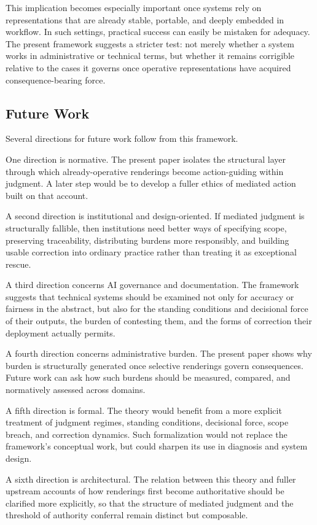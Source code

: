 \documentclass[11pt]{article}
\begin{document}
This implication becomes especially important once systems rely on representations that are already stable, portable, and deeply embedded in workflow. In such settings, practical success can easily be mistaken for adequacy. The present framework suggests a stricter test: not merely whether a system works in administrative or technical terms, but whether it remains corrigible relative to the cases it governs once operative representations have acquired consequence-bearing force.

\subsection{Future Work}

Several directions for future work follow from this framework.

One direction is normative. The present paper isolates the structural layer through which already-operative renderings become action-guiding within judgment. A later step would be to develop a fuller ethics of mediated action built on that account.

A second direction is institutional and design-oriented. If mediated judgment is structurally fallible, then institutions need better ways of specifying scope, preserving traceability, distributing burdens more responsibly, and building usable correction into ordinary practice rather than treating it as exceptional rescue.

A third direction concerns AI governance and documentation. The framework suggests that technical systems should be examined not only for accuracy or fairness in the abstract, but also for the standing conditions and decisional force of their outputs, the burden of contesting them, and the forms of correction their deployment actually permits.

A fourth direction concerns administrative burden. The present paper shows why burden is structurally generated once selective renderings govern consequences. Future work can ask how such burdens should be measured, compared, and normatively assessed across domains.

A fifth direction is formal. The theory would benefit from a more explicit treatment of judgment regimes, standing conditions, decisional force, scope breach, and correction dynamics. Such formalization would not replace the framework's conceptual work, but could sharpen its use in diagnosis and system design.

A sixth direction is architectural. The relation between this theory and fuller upstream accounts of how renderings first become authoritative should be clarified more explicitly, so that the structure of mediated judgment and the threshold of authority conferral remain distinct but composable.
\end{document}
